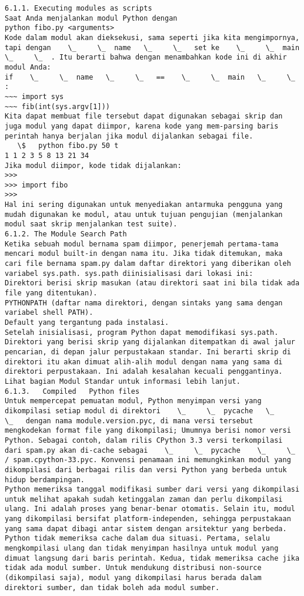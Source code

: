 \begin{verbatim}
6.1.1. Executing modules as scripts  
Saat Anda menjalankan modul Python dengan  
python fibo.py <arguments>  
Kode dalam modul akan dieksekusi, sama seperti jika kita mengimpornya, tapi dengan    \_     \_  name   \_     \_   set ke    \_     \_  main   \_     \_  . Itu berarti bahwa dengan menambahkan kode ini di akhir modul Anda: 
if    \_     \_  name   \_     \_   ==    \_     \_  main   \_     \_  :  
~~~ import sys 
~~~ fib(int(sys.argv[1])) 
Kita dapat membuat file tersebut dapat digunakan sebagai skrip dan juga modul yang dapat diimpor, karena kode yang mem-parsing baris perintah hanya berjalan jika modul dijalankan sebagai file.  
   \$   python fibo.py 50 t 
1 1 2 3 5 8 13 21 34  
Jika modul diimpor, kode tidak dijalankan:  
>>>  
>>> import fibo  
>>>  
Hal ini sering digunakan untuk menyediakan antarmuka pengguna yang mudah digunakan ke modul, atau untuk tujuan pengujian (menjalankan modul saat skrip menjalankan test suite). 
6.1.2. The Module Search Path 
Ketika sebuah modul bernama spam diimpor, penerjemah pertama-tama mencari modul built-in dengan nama itu. Jika tidak ditemukan, maka cari file bernama spam.py dalam daftar direktori yang diberikan oleh variabel sys.path. sys.path diinisialisasi dari lokasi ini:  
Direktori berisi skrip masukan (atau direktori saat ini bila tidak ada file yang ditentukan).  
PYTHONPATH (daftar nama direktori, dengan sintaks yang sama dengan variabel shell PATH).  
Default yang tergantung pada instalasi. 
Setelah inisialisasi, program Python dapat memodifikasi sys.path. Direktori yang berisi skrip yang dijalankan ditempatkan di awal jalur pencarian, di depan jalur perpustakaan standar. Ini berarti skrip di direktori itu akan dimuat alih-alih modul dengan nama yang sama di direktori perpustakaan. Ini adalah kesalahan kecuali penggantinya. Lihat bagian Modul Standar untuk informasi lebih lanjut.  
6.1.3.   Compiled   Python files  
Untuk mempercepat pemuatan modul, Python menyimpan versi yang dikompilasi setiap modul di direktori    \_     \_  pycache   \_     \_   dengan nama module.version.pyc, di mana versi tersebut mengkodekan format file yang dikompilasi; Umumnya berisi nomor versi Python. Sebagai contoh, dalam rilis CPython 3.3 versi terkompilasi dari spam.py akan di-cache sebagai    \_     \_  pycache    \_     \_   / spam.cpython-33.pyc. Konvensi penamaan ini memungkinkan modul yang dikompilasi dari berbagai rilis dan versi Python yang berbeda untuk hidup berdampingan.  
Python memeriksa tanggal modifikasi sumber dari versi yang dikompilasi untuk melihat apakah sudah ketinggalan zaman dan perlu dikompilasi ulang. Ini adalah proses yang benar-benar otomatis. Selain itu, modul yang dikompilasi bersifat platform-independen, sehingga perpustakaan yang sama dapat dibagi antar sistem dengan arsitektur yang berbeda. Python tidak memeriksa cache dalam dua situasi. Pertama, selalu mengkompilasi ulang dan tidak menyimpan hasilnya untuk modul yang dimuat langsung dari baris perintah. Kedua, tidak memeriksa cache jika tidak ada modul sumber. Untuk mendukung distribusi non-source (dikompilasi saja), modul yang dikompilasi harus berada dalam direktori sumber, dan tidak boleh ada modul sumber. 

\end{verbatim}
